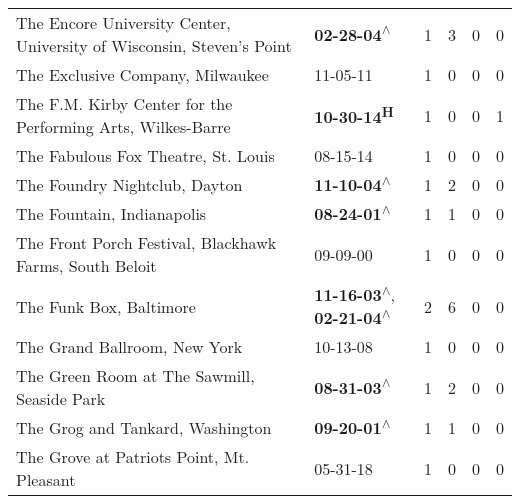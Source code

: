 \begin{supertabular}{p{0.4\textwidth}p{0.3\textwidth}p{0.05\textwidth}p{0.05\textwidth}p{0.05\textwidth}p{0.05\textwidth}}
        The Encore University Center, University of Wisconsin, Steven’s Point &                                                 \textbf{02-28-04\textsuperscript{$\wedge$}} &  1 &  3 &  0 &  0 \\
                                             The Exclusive Company, Milwaukee &                                                                  11-05-11\textsuperscript{} &  1 &  0 &  0 &  0 \\
                  The F.M. Kirby Center for the Performing Arts, Wilkes-Barre &                                                        \textbf{10-30-14\textsuperscript{H}} &  1 &  0 &  0 &  1 \\
                                          The Fabulous Fox Theatre, St. Louis &                                                                  08-15-14\textsuperscript{} &  1 &  0 &  0 &  0 \\
                                                The Foundry Nightclub, Dayton &                                                 \textbf{11-10-04\textsuperscript{$\wedge$}} &  1 &  2 &  0 &  0 \\
                                                   The Fountain, Indianapolis &                                                 \textbf{08-24-01\textsuperscript{$\wedge$}} &  1 &  1 &  0 &  0 \\
                      The Front Porch Festival, Blackhawk Farms, South Beloit &                                                                  09-09-00\textsuperscript{} &  1 &  0 &  0 &  0 \\
                                                      The Funk Box, Baltimore &    \textbf{11-16-03\textsuperscript{$\wedge$}}, \textbf{02-21-04\textsuperscript{$\wedge$}} &  2 &  6 &  0 &  0 \\
                                                 The Grand Ballroom, New York &                                                                  10-13-08\textsuperscript{} &  1 &  0 &  0 &  0 \\
                                  The Green Room at The Sawmill, Seaside Park &                                                 \textbf{08-31-03\textsuperscript{$\wedge$}} &  1 &  2 &  0 &  0 \\
                                             The Grog and Tankard, Washington &                                                 \textbf{09-20-01\textsuperscript{$\wedge$}} &  1 &  1 &  0 &  0 \\
                                    The Grove at Patriots Point, Mt. Pleasant &                                                                  05-31-18\textsuperscript{} &  1 &  0 &  0 &  0 \\

\end{supertabular}
